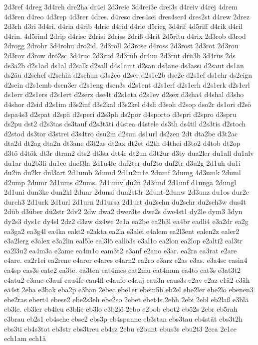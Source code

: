 {2d3ref
4dreg
3d4reh
dre2ha
dr4ei
2d3reic
3d4rei3e
drei3s
d4reiv
d4rej
4drem
4d3ren
d4reo
4d3rep
4d3rer
4dres.
d4resc
dres4sei
dres4ser4
dres2st
d4rew
2drez
2d3rh
d3ri
3d4ri.
d4ria
d4rib
4dric
d4rid
d4rie
d5rieg
3d4rif
4d5riff
d4rik
d4ril
d4rin.
4d5rind
2drip
d4risc
2drisi
2driss
2driß
d4rit
2d5ritu
d4rix
2d3rob
d3rod
2drogg
2drohr
3d4rohu
dro2id.
2d3roll
2d3rose
d4ross
2d3rost
2d3rot
2d3rou
2d3rov
d3row
drö2sc
3d4ruc
2d3rud
2d3ruh
dr4un
2d3rut
drü3b
3d4rüs
2ds
ds3a2b
d2s1ad
ds1al
d2salk
d2sall
d4s1amt
d2san
ds3ane
ds3assi
d2saut
ds1än
ds2äu
d2schef
d2schin
d2schun
d3s2co
d2scr
d2s1e2b
dse2e
d2s1ef
ds1ehr
ds2eign
d2sein
d2s1emb
dsen3er
d2s1eng
dsen3s
d2s1ent
d2s1erf
d2s1erh
d2s1erk
d2s1erl
ds1err
d2s1ers
d2s1ert
d2serz
dse4t
d2s1eta
d2s1ev
d2sex
d3sha4
d4shal
d3sho
d4shor
d2sid
d2s1im
d3s2inf
d3s2kal
d3s2kel
d4sli
d3soh
d2sop
dso2r
ds1ori
d2sö
dspa4s3
d2spat
d2spä
d2speri
d2s3ph
ds2por
d4sporto
d3spri
d2spro
d3spru
ds2pu
dst2
d2s3tas
ds3tauf
d2s3täti
d4stea
d4stele
ds3th
ds4til
d2s3tis
d2stoch
d2stod
ds3tor
d3strei
d3s4tro
dsu2m
d2sun
ds1url
ds2zen
2dt
dta2be
d3t2ac
dta2d
dt2ag
dta2n
dt3ane
d3t2as
dt2ax
dt2et
d2th
d4thei
d3to2
d4tob
dt2op
d3tö
d4tök
dt3r
dtran2
dts2
dt3sa
dtt4r
dt2un
d3t2ur
d3ty
dua2ler
du1all
du1alv
du1ar
du2b3li
du1ce
duel3la
2d1u4fe
duf2ter
duf2to
duf2tr
d3u2g
2d1uh
du1i
du2in
du2kr
dul3art
2d1umb
2dumd
2d1u2m1e
2dumf
2dumg
4d3umk
2duml
d2ump
2dumr
2d1ums
d2ums.
2d1umv
du2n
2d3und
2d1unf
d1unga
2dungl
2d1uni
dun3ke
dun2kl
2dunr
2dunsi
dun2st3r
2dunt
2dunw
2d3unz
du1os
dur2c
durch3
2d1urk
2d1url
2d1urn
2d1ursa
2d1urt
du2schn
du2schr
du2sch3w
dus4t
2düb
d3über
dü2str
2dv2
2dw
dwa2
dwer3te
dwe2s
dwe4st1
dy2le
dym3
3dyn
dy2s3
dys1c
dy4sl
2dz2
d3zw
dz4we
2e1a
ea2be
ea2b3l
ea4br
eadli4
e3a2dr
ea2g
ea3ga2
ea3g4l
ea4ka
eakt2
e2akta
ea2la
e3alei
e4alem
ea2l3ent
ealen2z
ealer2
e3a2lerg
e3alex
e3a2lin
eal5le
eal3lö
eallö3s
e3al1o
ea2lon
ea2lop
e2alti2
eal3tr
ea2l3u2
ea4m3a
e2ame
ea4m1o
eam3t2
e3anf
e2ano
e3ar.
ea2ra
ea3rat
e2are
e4are.
ea2r1ei
ea2rene
e4arer
e4ares
e4arn2
ea2ro
e3arz
e2as
e3as.
e3a4sc
easin4
ea4sp
eas3s
eate2
ea3te.
ea3ten
eat4mes
eat2mu
eat4mun
ea4to
eat3s
e3at3t2
e4atu2
e3aue
e3auf
eau4fe
eau4fl
e4aufo
e4auj
eau3n
eaus3s
e2av
e2az
e1ä2
e3äh
eä4st
2eba
e3bak
eba2p
e3bän
2ebec
ebe1er
ebein5h
eb2el
ebe2ler
ebe2lo
ebenen3
ebe2ras
ebert4
ebese2
ebe2s3eh
ebe2so
2ebet
ebet4s
2ebh
2ebi
2ebl
eb2laß
e3blä
eb3le.
eb3ler
eb4leu
e3blie
eb3lo
e3b2lö
2ebo
e2bob
ebot2
ebö2s
2ebr
eb5rah
e3brau
eb2s1
eb4sche
ebse2
ebs3p
eb4spanne
eb3stan
ebs3tau
eb4stät
ebs3t2h
ebs3ti
eb4s3tot
eb3str
ebs3treu
eb4sz
2ebu
e2bunt
ebus3s
ebu2t3
2eca
2e1ce
ech1am
ech1ä
}
